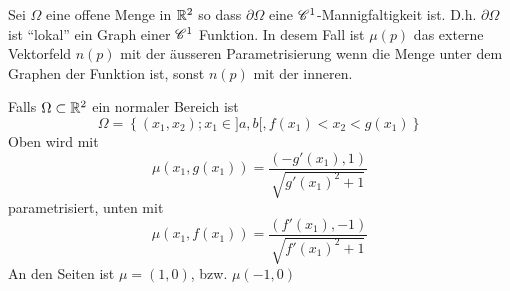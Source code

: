 \begin{Sat}
  Sei $\Omega$ eine offene Menge in $\mathbb{R}^2$ so dass $\partial\Omega$ eine $\mathscr{C}^1$-Mannigfaltigkeit ist. D.h. $\partial\Omega$ ist ``lokal'' ein Graph einer $\mathscr{C}^1$ Funktion. In desem Fall ist $\mu(p)$ das externe Vektorfeld $n(p)$ mit der äusseren Parametrisierung wenn die Menge unter dem Graphen der Funktion ist, sonst $n(p)$ mit der inneren.
\end{Sat}
\begin{Def}
  Falls $\Omega\subset\mathbb{R}^2$ ein normaler Bereich ist
  \[\Omega=\left\{ (x_1,x_2); x_1\in ]a,b[, f(x_1)<x_2<g(x_1) \right\}\]
  Oben wird mit
  \[\mu(x_1,g(x_1))=\frac{(-g'(x_1),1)}{\sqrt{g'(x_1)^2+1}}\]
  parametrisiert, unten mit
  \[\mu(x_1,f(x_1))=\frac{(f'(x_1),-1)}{\sqrt{f'(x_1)^2+1}}\]
  An den Seiten ist $\mu=(1,0)$, bzw. $\mu(-1,0)$
\end{Def}
